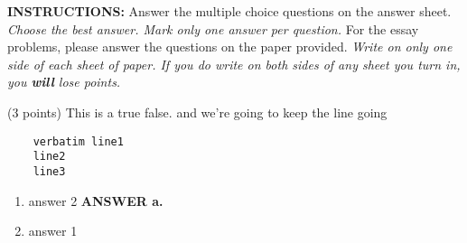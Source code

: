 \documentclass{article}
\newcommand{\ans}[1]{ \ifnum\showans=1 {\bf ANSWER #1.} \fi }
\begin{document}
{ \Large
\begin{center}
\end{center}
}

\vspace{.1in}

\noindent
{\Large\bf INSTRUCTIONS:} Answer the multiple choice questions on the
answer sheet.  {\em Choose the best answer.  Mark only one answer per
question.}  For the essay problems, please answer the questions on the
paper provided.  {\em Write on only one side of each sheet of paper.
If you do write on both sides of any sheet you turn in, you {\bf will}
lose points.}

\vspace{.1in}


\item (3 points) This is a true false.
and we're going to keep the line going
\begin{verbatim}
    verbatim line1
    line2
    line3
\end{verbatim}
  \begin{enumerate}
  \item answer 2  \ans{a}
  \item answer 1
  \end{enumerate}
\end{document}

